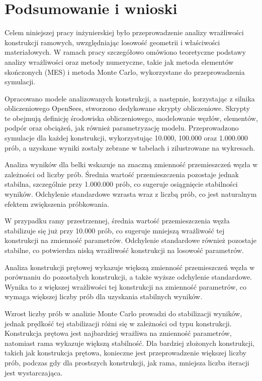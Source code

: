 \section{Podsumowanie i wnioski}

Celem niniejszej pracy inżynierskiej było przeprowadzenie analizy wrażliwości konstrukcji ramowych, uwzględniając losowość geometrii i właściwości materiałowych.
W ramach pracy szczegółowo omówiono teoretyczne podstawy analizy wrażliwości oraz metody numeryczne, takie jak metoda elementów skończonych (MES) i metoda Monte Carlo, wykorzystane do przeprowadzenia symulacji.

Opracowano modele analizowanych konstrukcji, a następnie, korzystając z silnika obliczeniowego OpenSees, stworzono dedykowane skrypty obliczeniowe.
Skrypty te obejmują definicję środowiska obliczeniowego, modelowanie węzłów, elementów, podpór oraz obciążeń, jak również parametryzację modelu.
Przeprowadzono symulacje dla każdej konstrukcji, wykorzystując 10.000, 100.000 oraz 1.000.000 prób, a uzyskane wyniki zostały zebrane w tabelach i zilustrowane na wykresach.

Analiza wyników dla belki wskazuje na znaczną zmienność przemieszczeń węzła w zależności od liczby prób.
Średnia wartość przemieszczenia pozostaje jednak stabilna, szczególnie przy 1.000.000 prób, co sugeruje osiągnięcie stabilności wyników.
Odchylenie standardowe wzrasta wraz z liczbą prób, co jest naturalnym efektem zwiększenia próbkowania.

W przypadku ramy przestrzennej, średnia wartość przemieszczenia węzła stabilizuje się już przy 10.000 prób, co sugeruje mniejszą wrażliwość tej konstrukcji na zmienność parametrów.
Odchylenie standardowe również pozostaje stabilne, co potwierdza niską wrażliwość konstrukcji na losowość parametrów.

Analiza konstrukcji prętowej wykazuje większą zmienność przemieszczeń węzła w porównaniu do pozostałych konstrukcji, a także wyższe odchylenie standardowe.
Wynika to z większej wrażliwości tej konstrukcji na zmienność parametrów, co wymaga większej liczby prób dla uzyskania stabilnych wyników.

Wzrost liczby prób w analizie Monte Carlo prowadzi do stabilizacji wyników, jednak prędkość tej stabilizacji różni się w zależności od typu konstrukcji.
Konstrukcja prętowa jest najbardziej wrażliwa na zmienność parametrów, natomiast rama wykazuje większą stabilność.
Dla bardziej złożonych konstrukcji, takich jak konstrukcja prętowa, konieczne jest przeprowadzenie większej liczby prób, podczas gdy dla prostszych konstrukcji, jak rama, mniejsza liczba iteracji jest wystarczająca.

